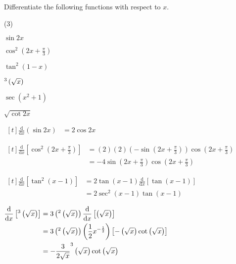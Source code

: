 \documentclass[11pt,a4paper]{book}
\let\csc\relax
\DeclareMathOperator{\csc}{cosec}
\begin{document}
\begin{example}


Differentiate the following functions with respect to $x$.

\begin{tasks}[label=(\alph*),label-width=3.5ex,after-item-skip=2mm](3)

\task $\sin2x$

\task ${\displaystyle \cos^{2}\left(2x+\frac{\pi}{3}\right)}$

\task $\tan^{2}(1-x)$

\task $\csc^{3}\left(\sqrt{x}\right)$

\task $\sec\left(x^{2}+1\right)$

\task $\sqrt{\cot2x}$

\end{tasks}

\Solution

\begin{tasks}[label=(\alph*),label-width=3.5ex]

\task
$
\begin{aligned}[t]
{\displaystyle \frac{\mathrm{d}}{\mathrm{d}x}\left(\sin2x\right)} & =2\cos2x
\end{aligned}
$

\task
$
\begin{aligned}[t]
{\displaystyle \frac{\mathrm{d}}{\mathrm{d}x}\left[{\displaystyle \cos^{2}\left(2x+\frac{\pi}{3}\right)}\right]} & =\left(2\right)\left(2\right)\left(-\sin\left(2x+\frac{\pi}{3}\right)\right)\cos\left(2x+\frac{\pi}{3}\right)\\
 & =-4\sin\left(2x+\frac{\pi}{3}\right)\cos\left(2x+\frac{\pi}{3}\right)
\end{aligned}
$

\task
$
\begin{aligned}[t]
{\displaystyle \frac{\mathrm{d}}{\mathrm{d}x}\left[{\displaystyle \tan^{2}\left(x-1\right)}\right]} & =2\tan\left(x-1\right)\frac{\mathrm{d}}{\mathrm{d}x}\left[\tan\left(x-1\right)\right]\\
 & =2\sec^{2}\left(x-1\right)\tan\left(x-1\right)
\end{aligned}
$

\task
$
\begin{aligned}[t]
{\displaystyle \frac{\mathrm{d}}{\mathrm{d}x}\left[\csc^{3}\left(\sqrt{x}\right)\right]} & =3\left(\csc^{2}\left(\sqrt{x}\right)\right)\frac{\mathrm{d}}{\mathrm{d}x}\left[\csc\left(\sqrt{x}\right)\right]\\
 & =3\left(\csc^{2}\left(\sqrt{x}\right)\right)\left(\frac{1}{2}x^{-\frac{1}{2}}\right)\left[-\csc\left(\sqrt{x}\right)\cot\left(\sqrt{x}\right)\right]\\
 & =-\frac{3}{2\sqrt{x}}\csc^{3}\left(\sqrt{x}\right)\cot\left(\sqrt{x}\right)
\end{aligned}
$


\end{tasks}
\end{example}
\end{document}
